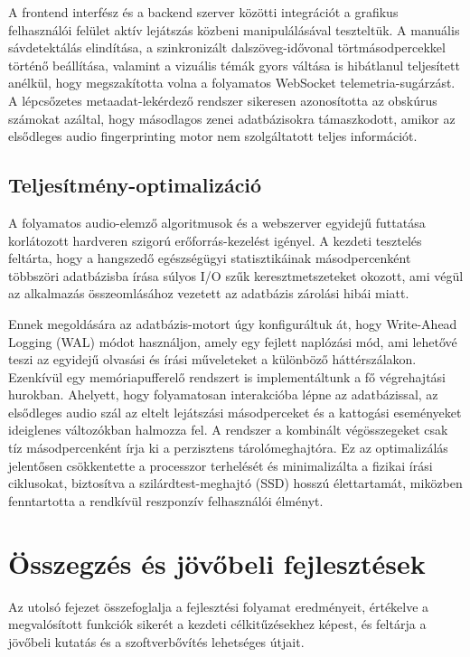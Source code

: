 \documentclass[12pt,a4paper,hungarian]{report}
\begin{document}
A frontend interfész és a backend szerver közötti integrációt a grafikus felhasználói felület aktív lejátszás közbeni manipulálásával teszteltük. A manuális sávdetektálás elindítása, a szinkronizált dalszöveg-idővonal törtmásodpercekkel történő beállítása, valamint a vizuális témák gyors váltása is hibátlanul teljesített anélkül, hogy megszakította volna a folyamatos WebSocket telemetria-sugárzást. A lépcsőzetes metaadat-lekérdező rendszer sikeresen azonosította az obskúrus számokat azáltal, hogy másodlagos zenei adatbázisokra támaszkodott, amikor az elsődleges audio fingerprinting motor nem szolgáltatott teljes információt.

\section{Teljesítmény-optimalizáció}

A folyamatos audio-elemző algoritmusok és a webszerver egyidejű futtatása korlátozott hardveren szigorú erőforrás-kezelést igényel. A kezdeti tesztelés feltárta, hogy a hangszedő egészségügyi statisztikáinak másodpercenként többszöri adatbázisba írása súlyos I/O szűk keresztmetszeteket okozott, ami végül az alkalmazás összeomlásához vezetett az adatbázis zárolási hibái miatt.

Ennek megoldására az adatbázis-motort úgy konfiguráltuk át, hogy Write-Ahead Logging (WAL) módot használjon, amely egy fejlett naplózási mód, ami lehetővé teszi az egyidejű olvasási és írási műveleteket a különböző háttérszálakon. Ezenkívül egy memóriapufferelő rendszert is implementáltunk a fő végrehajtási hurokban. Ahelyett, hogy folyamatosan interakcióba lépne az adatbázissal, az elsődleges audio szál az eltelt lejátszási másodperceket és a kattogási eseményeket ideiglenes változókban halmozza fel. A rendszer a kombinált végösszegeket csak tíz másodpercenként írja ki a perzisztens tárolómeghajtóra. Ez az optimalizálás jelentősen csökkentette a processzor terhelését és minimalizálta a fizikai írási ciklusokat, biztosítva a szilárdtest-meghajtó (SSD) hosszú élettartamát, miközben fenntartotta a rendkívül reszponzív felhasználói élményt.

\chapter{Összegzés és jövőbeli fejlesztések}

Az utolsó fejezet összefoglalja a fejlesztési folyamat eredményeit, értékelve a megvalósított funkciók sikerét a kezdeti célkitűzésekhez képest, és feltárja a jövőbeli kutatás és a szoftverbővítés lehetséges útjait.
\end{document}
